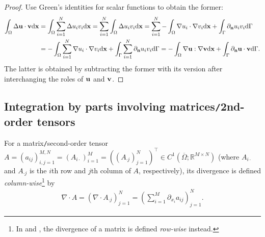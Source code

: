 \documentclass[oneside,11pt]{book}
\numberwithin{equation}{section}
\begin{document}
\begin{proof}
    Use Green's identities for scalar functions to obtain the former:
    \begin{align*}
        \int_\Omega \Delta{\bf u}\cdot{\bf v}{\rm d}{\bf x} &= \int_\Omega \sum_{i=1}^N \Delta u_iv_i{\rm d}{\bf x} = \sum_{i=1}^N \int_\Omega \Delta u_iv_i{\rm d}{\bf x} = \sum_{i=1}^N -\int_\Omega \nabla u_i\cdot\nabla v_i{\rm d}{\bf x} + \int_\Gamma \partial_{\bf n}u_iv_i{\rm d}\Gamma\\
        &= -\int_\Omega \sum_{i=1}^N \nabla u_i\cdot\nabla v_i{\rm d}{\bf x} + \int_\Gamma \sum_{i=1}^N \partial_{\bf n}u_iv_i{\rm d}\Gamma = -\int_\Omega \nabla{\bf u}:\nabla{\bf v}{\rm d}{\bf x} + \int_\Gamma \partial_{\bf n}{\bf u}\cdot{\bf v}{\rm d}\Gamma.
    \end{align*}
    The latter is obtained by subtracting the former with its version after interchanging the roles of ${\bf u}$ and ${\bf v}$.
\end{proof}

\subsection{Integration by parts involving matrices\texttt{/}2nd-order tensors}
For a matrix\texttt{/}second-order tensor $A = (a_{ij})_{i,j=1}^{M,N} = (A_{i \cdot})_{i=1}^M = ((A_{\cdot j})_{j=1}^N)^\top\in C^1(\overline{\Omega};\mathbb{R}^{M\times N})$ (where $A_{i \cdot}$ and $A_{\cdot j}$ is the $i$th row and $j$th column of $A$, respectively), its divergence is defined \textit{column-wise}\footnote{In \cite{John2004} and \cite{John2016}, the divergence of a matrix is defined \textit{row-wise} instead.} by
\begin{align*}
    \nabla\cdot A = \left(\nabla\cdot A_{\cdot j}\right)_{j=1}^N = \left(\sum_{i=1}^M \partial_{x_i}a_{ij}\right)_{j=1}^N.
\end{align*}
\end{document}
